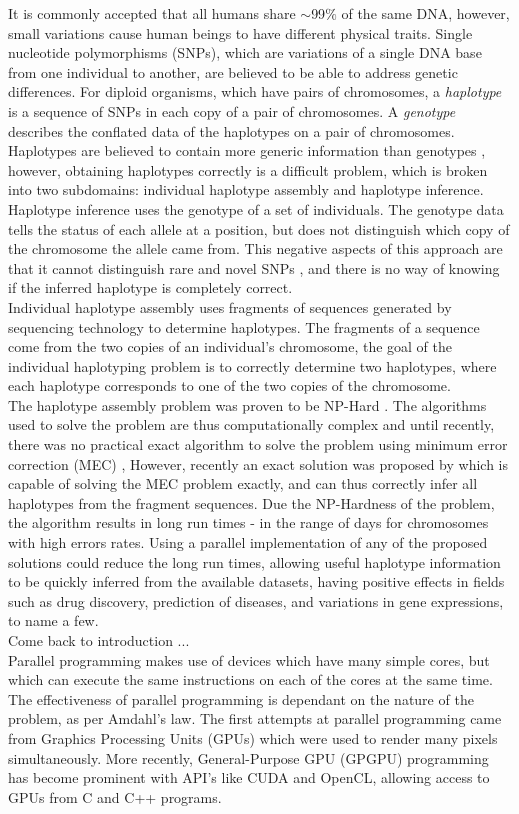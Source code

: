 \documentclass[10pt,twocolumn]{witseiepaper}
\begin{document}
It is commonly accepted that all humans share $\mathtt{\sim}$99$\%$ of the same DNA, however, small variations 
cause human beings to have different physical traits. Single nucleotide polymorphisms (SNPs), which are
variations of a single DNA base from one individual to another, are believed to be able to address
genetic differences. For diploid organisms, which have pairs of chromosomes, a \textit{haplotype} is a 
sequence of SNPs in each copy of a pair of chromosomes. A \textit{genotype} describes the conflated data of the
haplotypes on a pair of chromosomes. Haplotypes are believed to contain more generic information than
genotypes \cite{stephens:2001}, however, obtaining haplotypes correctly is a difficult problem, which is 
broken into two subdomains: individual haplotype assembly and haplotype inference. \\
Haplotype inference uses the genotype of a set of individuals. The genotype data tells the status of each
allele at a position, but does not distinguish which copy of the chromosome the allele came from.
This negative aspects of this approach are that it cannot distinguish rare and novel SNPs \cite{he:2010}, 
and there is no way of knowing if the inferred haplotype is completely correct. \\
Individual haplotype assembly uses fragments of sequences generated by sequencing technology to determine
haplotypes. The fragments of a sequence come from the two copies of an individual's chromosome, the goal of the
individual haplotyping problem is to correctly determine two haplotypes, where each haplotype corresponds to
one of the two copies of the chromosome. \\
The haplotype assembly problem was proven to be NP-Hard \cite{lippert:2002}. The algorithms used to solve the
problem are thus computationally complex and until recently, there was no practical exact algorithm to solve 
the problem using minimum error correction (MEC) \cite{bonizzoni:2003},
However, recently an exact solution was proposed by \cite{chen:2013} which is capable of solving the MEC 
problem exactly, and can thus correctly infer all haplotypes from the fragment sequences. Due the NP-Hardness 
of the problem, the algorithm results in long run times - in the range of days for chromosomes with high
errors rates. Using a parallel implementation of any of the proposed solutions could reduce the long run
times, allowing useful haplotype information to be quickly inferred from the available datasets, having
positive effects in fields such as drug discovery, prediction of diseases, and variations in gene
expressions, to name a few. \\
Come back to introduction ... \\
Parallel programming makes use of devices which have many simple cores, but which can execute the same
instructions on each of the cores at the same time. The effectiveness of parallel programming is dependant on
the nature of the problem, as per Amdahl's law. The first attempts at parallel programming came from Graphics
Processing Units (GPUs) which were used to render many pixels simultaneously. More recently, General-Purpose
GPU (GPGPU) programming has become prominent with API's like CUDA and OpenCL, allowing access to GPUs from C and
C++ programs. 
\end{document}
